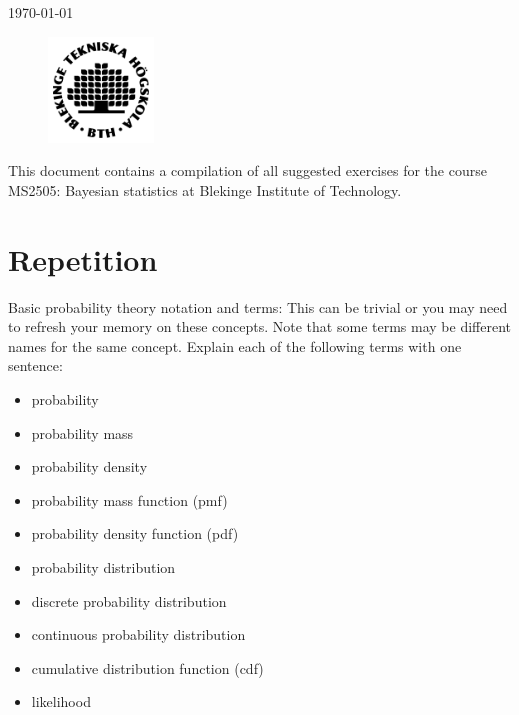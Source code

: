 \documentclass[12pt,a4paper,twoside]{article}
\begin{document}
\vspace*{3cm}

\begin{center}
    \Huge\textbf{\doctitle}\\
    \Large\textbf{\docsubtitle}
    \\\vspace*{5mm} 
    \large\today                            
\end{center} 

\vspace*{5mm}

\begin{figure}[!b]
    \centering
    \includegraphics[width = 0.25\textwidth]{../figures/BTH_logo_black.png}
\end{figure}

\newpage

This document contains a compilation of all suggested exercises for the course MS2505: Bayesian
statistics at Blekinge Institute of Technology\cite{TheCourse}.

\newpage
\section{Repetition}
Basic probability theory notation and terms: This can be trivial or you may need to refresh your memory on these
concepts. Note that some terms may be different names for the same concept. Explain each of the following terms with
one sentence:
\begin{itemize}
    \item probability
    \item probability mass
    \item probability density
    \item probability mass function (pmf)
    \item probability density function (pdf)
    \item probability distribution
    \item discrete probability distribution
    \item continuous probability distribution
    \item cumulative distribution function (cdf)
    \item likelihood
\end{itemize}
\end{document}
